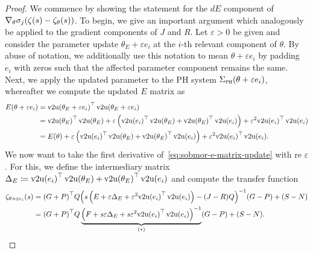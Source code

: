 \begin{proof}
    We commence by showing the statement for the $dE$ component of $\nabla_\theta \sigma_j(\zeta(s) - \zeta_\theta(s))$.
    To begin, we give an important argument which analogously be applied to the gradient components of $J$ and $R$.
    Let $\varepsilon > 0$ be given and consider the parameter update $\theta_E + \varepsilon e_i$ at the $i$-th relevant component of $\theta$.
    By abuse of notation, we additionally use this notation to mean $\theta + \varepsilon e_i$ by padding $e_i$ with zeros such that the affected parameter component remains the same.
    Next, we apply the updated parameter to the \ac{PH} system $\Sigma_{\textnormal{\scshape ph}}(\theta + \varepsilon e_i)$, whereafter we compute the updated $E$ matrix as
    \begin{equation}\label{eq:sobmor-e-matrix-update}
        \begin{aligned}
            E(\theta + \varepsilon e_i) &= {\vecupper(\theta_E + \varepsilon e_i)}\trans \vecupper(\theta_E + \varepsilon e_i) \\
             &= {\vecupper(\theta_E)}\trans \vecupper(\theta_E) + \varepsilon \left( {\vecupper(e_i)}\trans \vecupper(\theta_E) + {\vecupper(\theta_E)}\trans \vecupper(e_i) \right) + \varepsilon^2 {\vecupper(e_i)}\trans \vecupper(e_i) \\
             &= E(\theta) + \varepsilon \left( {\vecupper(e_i)}\trans \vecupper(\theta_E) + {\vecupper(\theta_E)}\trans \vecupper(e_i) \right) + \varepsilon^2 {\vecupper(e_i)}\trans \vecupper(e_i).
        \end{aligned}
    \end{equation}
    We now want to take the first derivative of~\eqref{eq:sobmor-e-matrix-update} with re $\varepsilon$.
    For this, we define the intermediary matrix $\Delta_E \coloneqq {\mathop{}\!\mathrm{v}2\mathrm{u}(e_i)}^{\top} \mathop{}\!\mathrm{v}2\mathrm{u}(\theta_E) + {\mathop{}\!\mathrm{v}2\mathrm{u}(\theta_E)}^{\top} \mathop{}\!\mathrm{v}2\mathrm{u}(e_i)$ and compute the transfer function
    \begin{equation}\label{eq:sobmor-e-variation}
        \begin{aligned}
            \tfunc_{\theta + \varepsilon e_i}(s) &= {(G + P)}\trans Q {\left( s \left( E + \varepsilon \Delta_E + \varepsilon^2 {\vecupper(e_i)}\trans \vecupper(e_i) \right) - (J - R) Q \right)}\inv (G - P) + (S - N) \\
             &= {(G + P)}\trans Q \underbrace{{\left( F + s \varepsilon \Delta_E + s \varepsilon^2 {\vecupper(e_i)}\trans \vecupper(e_i) \right)}\inv}_{(*)} (G - P) + (S - N).
        \end{aligned}

\end{equation}
\end{proof}
